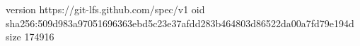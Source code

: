 version https://git-lfs.github.com/spec/v1
oid sha256:509d983a97051696363ebd5c23e37afdd283b464803d86522da00a7fd79e194d
size 174916
